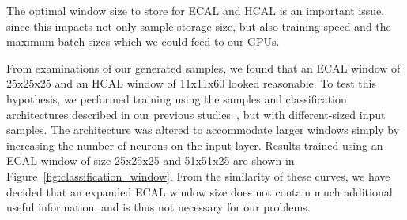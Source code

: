 The optimal window size to store for ECAL and HCAL is an important issue, since this impacts not only sample storage size, but also training speed and the maximum batch sizes which we could feed to our GPUs. 

From examinations of our generated samples, we found that an ECAL window of 25x25x25 and an HCAL window of 11x11x60 looked reasonable. To test this hypothesis, we performed training using the samples and classification architectures described in our previous studies~\cite{NIPS}, but with different-sized input samples. The architecture was altered to accommodate larger windows simply by increasing the number of neurons on the input layer. Results trained using an ECAL window of size 25x25x25 and 51x51x25 are shown in Figure~\ref{fig:classification_window}. From the similarity of these curves, we have decided that an expanded ECAL window size does not contain much additional useful information, and is thus not necessary for our problems.

